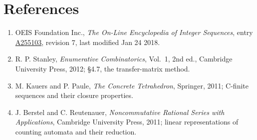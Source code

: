 \documentclass[11pt]{article}
\theoremstyle{definition}
\begin{document}
\section{References}

\begin{enumerate}

\item OEIS Foundation Inc., \emph{The On-Line Encyclopedia of Integer Sequences}, entry \href{https://oeis.org/A255103}{A255103}, revision 7, last modified Jan 24 2018.

\item R. P. Stanley, \emph{Enumerative Combinatorics}, Vol.~1, 2nd ed., Cambridge University Press, 2012; \S4.7, the transfer-matrix method.

\item M. Kauers and P. Paule, \emph{The Concrete Tetrahedron}, Springer, 2011; C-finite sequences and their closure properties.

\item J. Berstel and C. Reutenauer, \emph{Noncommutative Rational Series with Applications}, Cambridge University Press, 2011; linear representations of counting automata and their reduction.

\end{enumerate}
\end{document}
